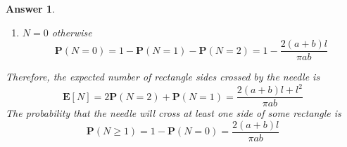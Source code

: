 \documentclass[utf8]{article}
\theoremstyle{definition}%
\theoremstyle{plain}%
\newtheorem{answer}{Answer} %
\begin{document}
\begin{answer}
\begin{enumerate}[label=(\alph*)]
        \begin{equation}
        \begin{aligned}
            \mathbf{P}(N = 1) &= \int_{0}^{\pi}\int_{0}^{b/2}\int_{0}^{\mid l\sin\theta \mid/2} \frac{4 \dd{x}\dd{y}\dd{\theta}}{\pi a b} + \int_{0}^{\pi}\int_{0}^{\mid l\cos\theta \mid/2}\int_{0}^{a/2} \frac{4 \dd{x}\dd{y}\dd{\theta}}{\pi a b} - \mathbf{P}(N = 2) \\
            &= \frac{2l}{\pi a} + \frac{2l}{\pi b} - \frac{l^2}{\pi ab} = \frac{2(a+b)l - l^2}{\pi ab}
        \end{aligned}
        \end{equation}
        \item $N = 0$ otherwise
        \begin{equation}
            \mathbf{P}(N = 0) = 1 - \mathbf{P}(N = 1) - \mathbf{P}(N = 2) = 1 - \frac{2(a+b)l}{\pi ab}
        \end{equation}
    \end{enumerate}
    Therefore, the expected number of rectangle sides crossed by the needle is
    \begin{equation}
        \mathbf{E}[N] = 2\mathbf{P}(N = 2) + \mathbf{P}(N = 1) = \frac{2(a+b)l + l^2}{\pi ab}
    \end{equation}
    The probability that the needle will cross at least one side of some rectangle is
    \begin{equation}
        \mathbf{P}(N \geq 1) = 1 - \mathbf{P}(N = 0) = \frac{2(a+b)l}{\pi ab}
    \end{equation}
\end{answer}
\end{document}
